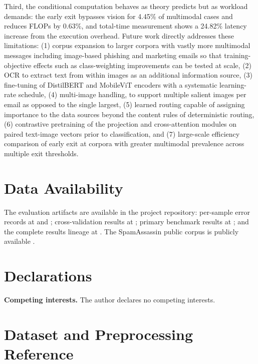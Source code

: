 \documentclass[10pt,twoside]{article}
\begin{document}
Third, the conditional computation behaves as theory predicts but as workload demands: the early exit bypasses vision for 4.45\% of multimodal cases and reduces FLOPs by 0.63\%, and total-time measurement shows a 24.82\% latency increase from the execution overhead. Future work directly addresses these limitations: (1) corpus expansion to larger corpora with vastly more multimodal messages including image-based phishing and marketing emails so that training-objective effects such as class-weighting improvements can be tested at scale, (2) OCR to extract text from within images as an additional information source, (3) fine-tuning of DistilBERT and MobileViT encoders with a systematic learning-rate schedule, (4) multi-image handling, to support multiple salient images per email as opposed to the single largest, (5) learned routing capable of assigning importance to the data sources beyond the content rules of deterministic routing, (6) contrastive pretraining of the projection and cross-attention modules on paired text-image vectors prior to classification, and (7) large-scale efficiency comparison of early exit at corpora with greater multimodal prevalence across multiple exit thresholds.

\section*{Data Availability}

The evaluation artifacts are available in the project repository: per-sample error records at  and ; cross-validation results at ; primary benchmark results at ; and the complete results lineage at . The SpamAssassin public corpus is publicly available \citep{spamassassin2006}.

\section*{Declarations}

\textbf{Competing interests.} The author declares no competing interests.

\appendix

\section{Dataset and Preprocessing Reference}\label{app:A}
\end{document}
